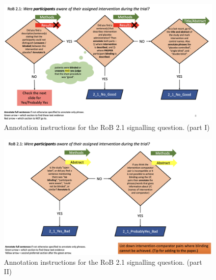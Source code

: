 \documentclass[sn-mathphys,Numbered]{sn-jnl}%
\begin{document}

%
%
%
\begin{figure}[hbt]
    \centering
    \includegraphics[width=\textwidth]{figures/2_1.png}
    \caption{Annotation instructions for the RoB 2.1 signalling question. (part I)}
    \label{fig:2_1}
\end{figure}
\begin{figure}[hbt]
    \centering
    \includegraphics[width=\textwidth]{figures/2_1_1.png}
    \caption{Annotation instructions for the RoB 2.1 signalling question. (part II)}
    \label{fig:2_1_1}
\end{figure}
%
%
%
\end{document}
